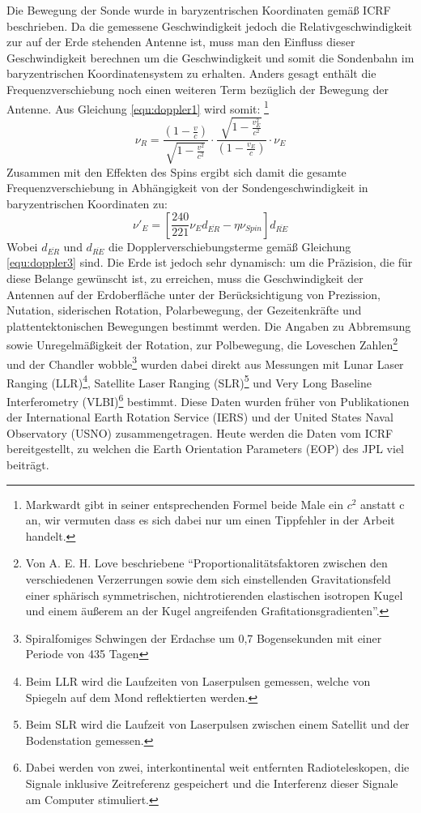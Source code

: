 Die Bewegung der Sonde wurde in baryzentrischen Koordinaten gemäß ICRF beschrieben. %
Da die gemessene Geschwindigkeit jedoch die Relativgeschwindigkeit zur auf der Erde stehenden Antenne ist,
muss man den Einfluss dieser Geschwindigkeit berechnen um die Geschwindigkeit und somit die Sondenbahn im baryzentrischen Koordinatensystem zu erhalten.
Anders gesagt enthält die Frequenzverschiebung noch einen weiteren Term bezüglich der Bewegung der Antenne. Aus Gleichung \ref{equ:doppler1} wird somit:
\footnote{Markwardt gibt in seiner entsprechenden Formel beide Male ein $c^2$ anstatt c an, wir vermuten dass es sich dabei nur um einen Tippfehler in der Arbeit handelt.}
\begin{equation}
\label{equ:doppler3}
 \nu_R = \frac{(1-\frac{v}{c})}{\sqrt{1-\frac{v^2}{c^2}}} \cdot \frac{\sqrt{1-\frac{v_E^2}{c^2}}}{(1-\frac{v_E}{c})} \cdot \nu_E 
\end{equation}
Zusammen mit den Effekten des Spins ergibt sich damit die gesamte Frequenzverschiebung in Abhängigkeit von der Sondengeschwindigkeit in baryzentrischen Koordinaten zu:
\begin{equation}
 \nu'_E = \left[ \frac{240}{221} \nu_E d_{\overline{ER}} - \eta \nu_{Spin} \right]  d_{\overline{RE}}
\end{equation}
Wobei $d_{\overline{ER}}$ und $d_{\overline{RE}}$ die Dopplerverschiebungsterme gemäß Gleichung \ref{equ:doppler3} sind.
Die Erde ist jedoch sehr dynamisch: um die Präzision, die für diese Belange gewünscht ist, zu erreichen, muss die Geschwindigkeit der Antennen auf der Erdoberfläche unter der Berücksichtigung von Prezission, Nutation,
siderischen Rotation, Polarbewegung, der Gezeitenkräfte und plattentektonischen Bewegungen bestimmt werden.
Die Angaben zu Abbremsung sowie Unregelmäßigkeit der Rotation, zur Polbewegung, die Loveschen Zahlen\footnote{Von A. E. H. Love beschriebene ``Proportionalitätsfaktoren zwischen den verschiedenen Verzerrungen sowie dem sich einstellenden Gravitationsfeld einer sphärisch symmetrischen, nichtrotierenden elastischen isotropen Kugel und einem äußerem an der Kugel angreifenden Grafitationsgradienten''\cite{Dittus2006}.} und der Chandler wobble\footnote{Spiralfomiges Schwingen
der Erdachse um 0,7 Bogensekunden mit einer Periode von 435 Tagen} %
wurden dabei direkt aus Messungen mit Lunar Laser Ranging (LLR)\footnote{Beim LLR wird die Laufzeiten von Laserpulsen gemessen, welche von Spiegeln auf dem Mond reflektierten werden.},
Satellite Laser Ranging (SLR)\footnote{Beim SLR wird die Laufzeit von Laserpulsen zwischen einem Satellit und der Bodenstation gemessen.} und Very Long Baseline Interferometry
(VLBI)\footnote{Dabei werden von zwei, interkontinental weit entfernten Radioteleskopen, die Signale inklusive
Zeitreferenz gespeichert und die Interferenz dieser Signale am Computer stimuliert.} bestimmt.
Diese Daten wurden früher von Publikationen der International Earth Rotation Service (IERS) und der United States Naval Observatory (USNO) zusammengetragen. Heute werden die Daten vom ICRF bereitgestellt,
zu welchen die Earth Orientation Parameters (EOP) des JPL viel beiträgt\cite{Anderson2002}.

